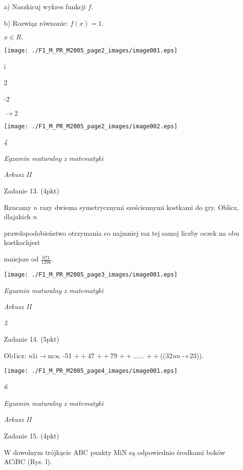\documentclass[a4paper,12pt]{article}
\begin{document}
a) Naszkicuj wykres funkcji $f.$

b) Rozwiąz równanie: $f(x)=1.$

$x\in R.$
\begin{center}
\texttt{[image: ./F1\_M\_PR\_M2005\_page2\_images/image001.eps]}
\end{center}
i

2

-2

$\rightarrow 2$
\begin{center}
\texttt{[image: ./F1\_M\_PR\_M2005\_page2\_images/image002.eps]}
\end{center}




{\it 4}

{\it Egzamin maturalny z matematyki}

{\it Arkusz II}

Zadanie 13. (4pkt)

Rzucamy $n$ razy dwiema symetrycznymi sześciennymi kostkami do gry. Oblicz, dlajakich $n$

prawdopodobieństwo otrzymania co najmniej raz tej samej liczby oczek na obu kostkachjest

mniejsze od $\displaystyle \frac{671}{1296}.$
\begin{center}
\texttt{[image: ./F1\_M\_PR\_M2005\_page3\_images/image001.eps]}
\end{center}




{\it Egzamin maturalny z matematyki}

{\it Arkusz II}

{\it 5}

Zadanie 14. (5pkt)

Ob1icz: {\it n}1i$\rightarrow$m$\infty$ -51 $++$47 $++$79 $++$...... $++$((32{\it nn} -$+$23)).
\begin{center}
\texttt{[image: ./F1\_M\_PR\_M2005\_page4\_images/image001.eps]}
\end{center}




{\it 6}

{\it Egzamin maturalny z matematyki}

{\it Arkusz II}

Zadanie 15. (4pkt)

W dowolnym trójkącie ABC punkty MiN są odpowiednio środkami boków ACiBC (Rys. l).
\end{document}
